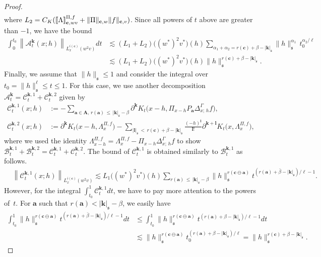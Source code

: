\documentclass[AHL,Unicode,longabstracts,published]{cedram}
\newcommand{\mfs}{\mathfrak{s}}
\newcommand{\wco}{w^*}
\newcommand{\vco}{v^*}
\newcommand{\bfa}{\mathbf{a}}
\newcommand{\bfc}{\mathbf{c}}
\newcommand{\bfcoa}{\mathbf{c}\ominus\mathbf{a}}
\newcommand{\bfA}{\mathbf{A}}
\newcommand{\bfk}{\mathbf{k}}
\newcommand{\bfl}{\mathbf{l}}
\newcommand{\mcA}{\mathcal{A}}
\newcommand{\mcB}{\mathcal{B}}
\newcommand{\mcC}{\mathcal{C}}
\newcommand{\llbracket}{\mathopen{[\mkern -2.7mu[}}
\newcommand{\rrbracket}{\mathclose{]\mkern -2.7mu]}}
\newcommand{\lb}{\llbracket}
\newcommand{\rb}{\rrbracket}
\begin{document}
\begin{proof}
\begin{align*}
\end{align*}
where $L_2=C_K(\lb\Lambda\rb_{\bfc,wv}^{\Pi,f}+\|\Pi\|_{\bfc,w}\|f\|_{\bfc,v})$. Since all powers of $t$ above are greater than $-1$, we have the bound
\begin{align*}
\int_0^{t_0}\left\|\mcA_t^{\bfk}(x;h)\right\|_{L_x^{i(\bfc)}(w^2v)}dt &\lesssim(L_1+L_2)\big((\wco)^2\vco\big)(h)
\sum_{\alpha_1+\alpha_2=r(\bfc)+\beta-|{\bfk}|_{\mfs}}\|h\|_{\mfs}^{\alpha_1}\, t_0^{\alpha_2/\ell}\\
&\lesssim(L_1+L_2)\big((\wco)^2\vco\big)(h)
\|h\|_{\mfs}^{r(\bfc)+\beta-|{\bfk}|_{\mfs}}.
\end{align*}
Finally, we assume that $\|h\|_\mfs\le1$ and consider the integral over $t_0=\|h\|_\mfs^\ell\le t\le1$. For this case, we use another decomposition $\mcA_t^{\bfk}=\mcC_t^{{\bfk},1}+\mcC_t^{{\bfk},2}$ given by
\begin{align*}
\mcC_t^{{\bfk},1}(x;h)&:=-\sum_{\bfa\in \bfA,\,r(\bfa)\,\le\,|{\bfk}|_{\mfs}-\beta}\partial^{\bfk}K_t\big(x-h,\Pi_{x-h} P_\bfa\Delta_{x;\,h}^\Gamma f\big),\\
\mcC_t^{{\bfk},2}(x;h)&:=\partial^{\bfk}K_t\big(x-h, \Lambda_x^{\Pi,f}\big) -\sum_{|{\bfl}|_\mfs\,<\,r(\bfc)+\beta-|{\bfk}|_\mfs}\frac{(-h)^{\bfl}}{{\bfl}!}\partial^{{\bfk}+{\bfl}}K_t\big(x,\Lambda_x^{\Pi,f}\big),
\end{align*}
where we used the identity $\Lambda_{x-h}^{\Pi,f}=\Lambda_x^{\Pi,f}-\Pi_{x-h}\Delta_{x;\,h}^\Gamma f$ to show $\mcB_t^{{\bfk},1}+\mcB_t^{{\bfk},2}=\mcC_t^{{\bfk},1}+\mcC_t^{{\bfk},2}$. The bound of $\mcC_t^{{\bfk},1}$ is obtained similarly to $\mcB_t^{{\bfk},1}$ as follows.
\begin{align*}
&\left\|\mcC_t^{{\bfk},1}(x;h)\right\|_{L_x^{i(\bfc)}(w^2v)}
\lesssim L_1\big((\wco)^2\vco\big)(h)
\sum_{r(\bfa)\,\le\,|{\bfk}|_{\mfs}-\beta}\|h\|_{\mfs}^{r(\bfcoa)}t^{\left(r(\bfa)+\bar\beta-|{\bfk}|_{\mfs}\right)/\ell-1}.
\end{align*}
However, for the integral $\int_{t_0}^1\mcC_t^{{\bfk},1}dt$, we have to pay more attention to the powers of~$t$. For $\bfa$ such that $r(\bfa)<|{\bfk}|_\mfs-\beta$, we easily have
\begin{align*}
\int_{t_0}^1\|h\|_{\mfs}^{r(\bfcoa)}t^{\left(r(\bfa)+\bar\beta-|{\bfk}|_{\mfs}\right)/\ell-1}dt &\le\int_{t_0}^1\|h\|_{\mfs}^{r(\bfcoa)}t^{(r(\bfa)+\beta-|{\bfk}|_{\mfs})/\ell-1}dt\\
&\lesssim\|h\|_{\mfs}^{r(\bfcoa)}t_0^{(r(\bfa)+\beta-|{\bfk}|_\mfs)/\ell} =\|h\|_\mfs^{r(\bfc)+\beta-|{\bfk}|_\mfs}.
\end{align*}

\end{proof}
\end{document}
